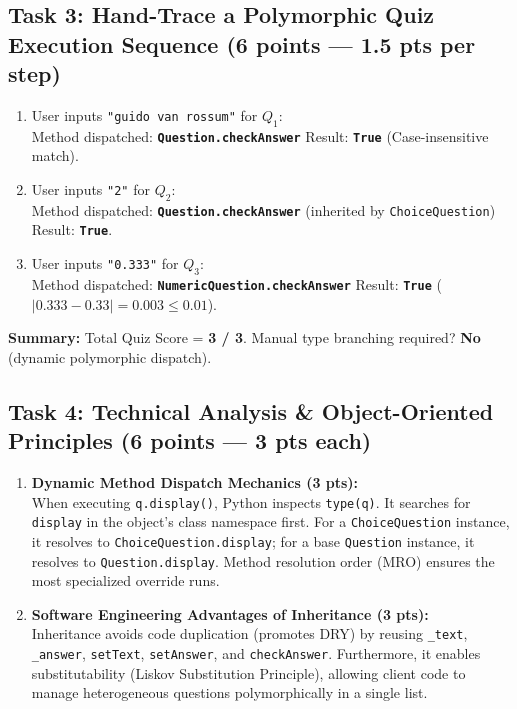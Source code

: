 \documentclass[11pt,a4paper]{article}
\begin{document}
\subsection*{Task 3: Hand-Trace a Polymorphic Quiz Execution Sequence (6 points --- 1.5 pts per step)}
\begin{enumerate}[itemsep=1.0pt]
\item User inputs \texttt{"guido van rossum"} for $Q_1$:\\
  Method dispatched: \textbf{\texttt{Question.checkAnswer}} \quad Result: \textbf{\texttt{True}} (Case-insensitive match).
\item User inputs \texttt{"2"} for $Q_2$:\\
  Method dispatched: \textbf{\texttt{Question.checkAnswer}} (inherited by \texttt{ChoiceQuestion}) \quad Result: \textbf{\texttt{True}}.
\item User inputs \texttt{"0.333"} for $Q_3$:\\
  Method dispatched: \textbf{\texttt{NumericQuestion.checkAnswer}} \quad Result: \textbf{\texttt{True}} ($|0.333 - 0.33| = 0.003 \le 0.01$).
\end{enumerate}
\textbf{Summary:} Total Quiz Score = \textbf{3 / 3}. Manual type branching required? \textbf{No} (dynamic polymorphic dispatch).

\subsection*{Task 4: Technical Analysis \& Object-Oriented Principles (6 points --- 3 pts each)}
\begin{enumerate}[label=\alph*),itemsep=1.5pt]
\item \textbf{Dynamic Method Dispatch Mechanics (3 pts):}\\
  When executing \texttt{q.display()}, Python inspects \texttt{type(q)}. It searches for \texttt{display} in the object's class namespace first. For a \texttt{ChoiceQuestion} instance, it resolves to \texttt{ChoiceQuestion.display}; for a base \texttt{Question} instance, it resolves to \texttt{Question.display}. Method resolution order (MRO) ensures the most specialized override runs.
\item \textbf{Software Engineering Advantages of Inheritance (3 pts):}\\
  Inheritance avoids code duplication (promotes DRY) by reusing \texttt{\_text}, \texttt{\_answer}, \texttt{setText}, \texttt{setAnswer}, and \texttt{checkAnswer}. Furthermore, it enables substitutability (Liskov Substitution Principle), allowing client code to manage heterogeneous questions polymorphically in a single list.
\end{enumerate}
\end{document}
